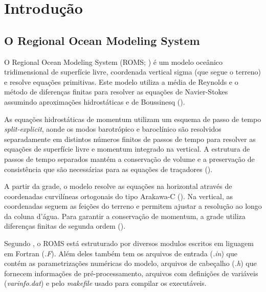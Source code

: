 \chapter{Introdução}

\bigskip


\section{O Regional Ocean Modeling System}
\bigskip
\noindent O Regional Ocean Modeling System (ROMS; \cite{Shchepetkin2005}) é um modelo oceânico tridimensional de superfície livre, coordenada vertical sigma (que segue o terreno) e resolve equações primitivas. Este modelo utiliza a média de Reynolds e o método de diferenças finitas para resolver as equações de Navier-Stokes assumindo aproximações hidrostáticas e de Boussinesq (\cite{Haidvogel2008}).
\bigskip

\noindent As equações hidrostáticas de momentum utilizam um esquema de passo de tempo \textit{split-explicit}, aonde os modos barotrópico e baroclínico são resolvidos separadamente em distintos números finitos de passos de tempo para resolver as equações de superfície livre e momentum integrado na vertical. A estrutura de passos de tempo separados mantém a conservação de volume e a preservação de consistência que são necessárias para as equações de traçadores (\cite{Shchepetkin2005,Haidvogel2008}).
\bigskip

\noindent A partir da grade, o modelo resolve as equações na horizontal através de coordenadas curvilíneas ortogonais do tipo Arakawa-C (\cite{Arakawa1977}). Na vertical, as coordenadas seguem as feições do terreno e permitem ajustar a resolução ao longo da coluna d'água. Para garantir a conservação de momentum, a grade utiliza diferenças finitas de segunda ordem (\cite{Haidvogel2008}).
\bigskip

\noindent Segundo \textcite{Gouveia2015}, o ROMS está estruturado por diversos modulos escritos em liguagem em Fortran (\textit{.F}). Além deles também tem os arquivos de entrada (\textit{.in}) que contém as parametrizações numéricas do modelo, arquivos de cabeçalho (\textit{.h}) que fornecem informações de pré-processamento, arquivos com definições de variáveis (\textit{varinfo.dat}) e pelo \textit{makefile} usado para compilar os executáveis.
\bigskip


